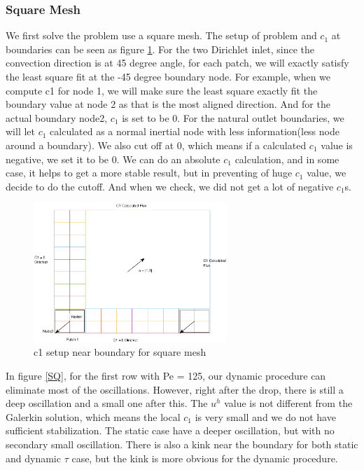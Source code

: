 \documentclass[10pt]{article}
\begin{document}
\subsubsection{Square Mesh}
We first solve the problem use a square mesh. The setup of problem and $c_1$ at boundaries can be seen as figure \ref{SQmesh}. For the two Dirichlet inlet, since the convection direction is at 45 degree angle, for each patch, we will exactly satisfy the least square fit at the -45 degree boundary node. For example, when we compute c1 for node 1, we will make sure the least square exactly fit the boundary value at node 2 as that is the most aligned direction. And for the actual boundary node2, $c_1$ is set to be 0. For the natural outlet boundaries, we will let $c_1$ calculated as a normal inertial node with less information(less node around a boundary). We also cut off at 0, which means if a calculated $c_1$ value is negative, we set it to be 0. We can do an absolute $c_1$ calculation, and in some case, it helps to get a more stable result, but in preventing of huge $c_1$ value, we decide to do the cutoff. And when we check, we did not get a lot of negative $c_1$s.
\begin{figure}[h!]
	\begin{center}
	\includegraphics[width=0.65\textwidth, clip]{./figure/SQmeshGrid.eps}
	\end{center}
		\vspace{0mm}
    \caption{c1 setup near boundary for square mesh}
  	\label{SQmesh}
\end{figure}
In figure \ref{SQ}, for the first row with Pe = 125, our dynamic procedure can eliminate most of the oscillations. However, right after the drop, there is still a deep oscillation and a small one after this. The $u^h$ value is not different from the Galerkin solution, which means the local $c_1$ is very small and we do not have sufficient stabilization. The static case have a deeper oscillation, but with no secondary small oscillation. There is also a kink near the boundary for both static and dynamic $\tau$ case, but the kink is more obvious for the dynamic procedure.\\
\end{document}
